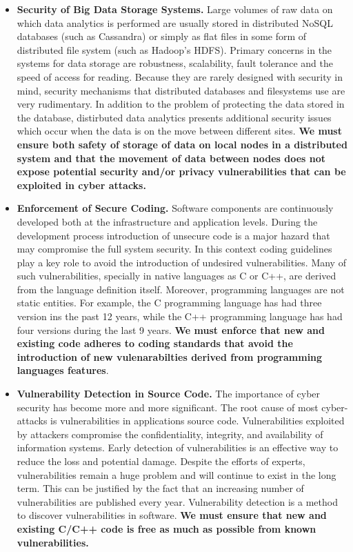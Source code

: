 \documentclass[a4paper,11pt]{article}
\begin{document}
\begin{itemize}
\item \textbf{Security of Big Data Storage Systems.} Large volumes of raw data on which data analytics is performed are usually stored in distributed NoSQL databases (such as Cassandra) or simply as flat files in some form of distributed file system (such as Hadoop's HDFS). Primary concerns in the systems for data storage are robustness, scalability, fault tolerance and the speed of access for reading. Because they are rarely designed with security in mind, security mechanisms that distributed databases and filesystems use are very rudimentary. In addition to the problem of protecting the data stored in the database, distirbuted data analytics presents additional security issues which occur when the data is on the move between different sites. \textbf{We must ensure both safety of storage of data on local nodes in a distributed system and that the movement of data between nodes does not expose potential security and/or privacy vulnerabilities that can be exploited in cyber attacks.}

\item \textbf{Enforcement of Secure Coding.} Software components are continuously developed both at the infrastructure and application levels. During the development process introduction of unsecure code is a major hazard that may compromise the full system security. In this context coding guidelines play a key role to avoid the introduction of undesired vulnerabilities. Many of such vulnerabilities, specially in native languages as C or C++, are derived from the language definition itself. Moreover, programming languages are not static entities. For example, the C programming language has had three version ins the past 12 years, while the C++ programming language has had four versions during the last 9 years. \textbf{We must enforce that new and existing code adheres to coding standards that avoid the introduction of new vulenarabilties derived from programming languages features}. 

\item \textbf{Vulnerability Detection in Source Code.} The importance of cyber security has become more and more signiﬁcant. The root cause of most cyber-attacks is vulnerabilities in applications source code. Vulnerabilities exploited by attackers compromise the conﬁdentiality, integrity, and availability of information systems. Early detection of vulnerabilities is an eﬀective way to reduce the loss and potential damage. Despite the eﬀorts of experts, vulnerabilities remain a huge problem and will continue to exist in the long term. This can be justiﬁed by the fact that an increasing number of vulnerabilities are published every year. Vulnerability detection is a method to discover vulnerabilities in software. \textbf{We must ensure that new and existing C/C++ code is free as much as possible from known vulnerabilities.}


\end{itemize}
\end{document}

